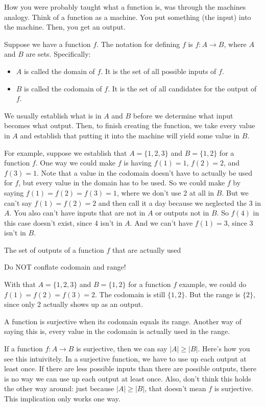 \documentclass[11pt]{scrartcl}
\begin{document}
How you were probably taught what a function is, was through the machines analogy. Think of a function as a machine. You put something (the input) into the machine. Then, you get an output.

Suppose we have a function $f$. The notation for defining $f$ is $f : A \rightarrow B$, where $A$ and $B$ are sets. Specifically:
\begin{itemize}
    \item $A$ is called the domain of $f$. It is the set of all possible inputs of $f$.
    \item $B$ is called the codomain of $f$. It is the set of all candidates for the output of $f$.
\end{itemize}
We usually establish what is in $A$ and $B$ before we determine what input becomes what output. Then, to finish creating the function, we take every value in $A$ and establish that putting it into the machine will yield some value in $B$.

For example, suppose we establish that $A = \{1, 2, 3\}$ and $B = \{1, 2\}$ for a function $f$. One way we could make $f$ is having $f(1) = 1$, $f(2) = 2$, and $f(3) = 1$. Note that a value in the codomain doesn't have to actually be used for $f$, but every value in the domain has to be used. So we could make $f$ by saying $f(1) = f(2) = f(3) = 1$, where we don't use 2 at all in $B$. But we can't say $f(1) = f(2) = 2$ and then call it a day because we neglected the $3$ in $A$. You also can't have inputs that are not in $A$ or outputs not in $B$. So $f(4)$ in this case doesn't exist, since 4 isn't in $A$. And we can't have $f(1) = 3$, since 3 isn't in $B$.

\begin{definition}[Range]
    The set of outputs of a function $f$ that are actually used
\end{definition}

\begin{caveat}
    Do NOT conflate codomain and range!
\end{caveat}
With that $A = \{1, 2, 3\}$ and $B = \{1, 2\}$ for a function $f$ example, we could do $f(1) = f(2) = f(3) = 2$. The codomain is still $\{1, 2\}$. But the range is $\{2\}$, since only 2 actually shows up as an output.

\begin{definition}
    A function is surjective when its codomain equals its range. Another way of saying this is, every value in the codomain is actually used in the range.
\end{definition}
If a function $f : A \rightarrow B$ is surjective, then we can say $|A| \geq |B|$. Here's how you see this intuivitely. In a surjective function, we have to use up each output at least once. If there are less possible inputs than there are possible outputs, there is no way we can use up each output at least once. Also, don't think this holds the other way around: just because $|A| \geq |B|$, that doesn't mean $f$ is surjective. This implication only works one way.
\end{document}

